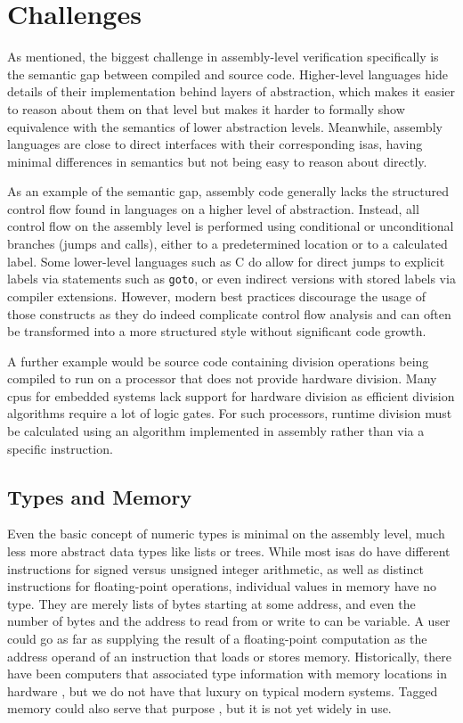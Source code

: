 
\section{Challenges}\label{challenges}
As mentioned, the biggest challenge in assembly-level verification specifically is the semantic gap between compiled and source code.
Higher-level languages hide details of their implementation behind layers of abstraction, which makes it easier to reason about them on that level but makes it harder to formally show equivalence with the semantics of lower abstraction levels.
Meanwhile, assembly languages are close to direct interfaces with their corresponding \acp{isa}, having minimal differences in semantics but not being easy to reason about directly.

As an example of the semantic gap, assembly code generally lacks the structured control flow found in languages on a higher level of abstraction.
Instead, all control flow on the assembly level is performed using conditional or unconditional branches (jumps and calls), either to a predetermined location or to a calculated label.
Some lower-level languages such as C do allow for direct jumps to explicit labels via statements such as \lstinline|goto|, or even indirect versions with stored labels via compiler extensions.
However, modern best practices discourage the usage of those constructs as they do indeed complicate control flow analysis and can often be transformed into a more structured style without significant code growth.

A further example would be source code containing division operations being compiled to run on a processor that does not provide hardware division.
Many \acp{cpu} for embedded systems lack support for hardware division as efficient division algorithms require a lot of logic gates.
For such processors, runtime division must be calculated using an algorithm implemented in assembly rather than via a specific instruction.

\subsection{Types and Memory}
Even the basic concept of numeric types is minimal on the assembly level, much less more abstract data types like lists or trees.
While most \acp{isa} do have different instructions for signed versus unsigned integer arithmetic, as well as distinct instructions for floating-point operations, individual values in memory have no type.
They are merely lists of bytes starting at some address, and even the number of bytes and the address to read from or write to can be variable.
A user could go as far as supplying the result of a floating-point computation as the address operand of an instruction that loads or stores memory.
Historically, there have been computers that associated type information with memory locations in hardware \autocite{feustel1972rice,feustel1973advantages,thornton2008rice}, but we do not have that luxury on typical modern systems.
Tagged memory could also serve that purpose , but it is not yet widely in use.

